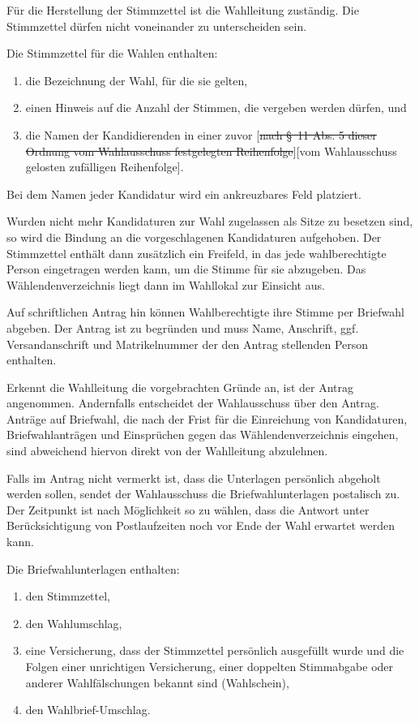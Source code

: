\documentclass[%
draft,%
multilinesections%
]{fswo}
\newcommand\oldT[1]  {{\color{Gray}[\st{#1}]}}
\newcommand\newT[1]  {{\color{Green}[#1]}}
\newcommand\oldT[1]{}%
\newcommand\newT[1]{#1}
\newcommand\change[2]{\oldT{#1}\newT{#2}}
\begin{document}
\begin{contract}
Für die Herstellung der Stimmzettel ist die Wahlleitung zuständig.
Die Stimmzettel dürfen nicht voneinander zu unterscheiden sein.

Die Stimmzettel für die Wahlen enthalten:
\begin{enumerate}
\item die Bezeichnung der Wahl, für die sie gelten,
\item einen Hinweis auf die Anzahl der Stimmen, die vergeben werden dürfen, und
\item die Namen der Kandidierenden in einer zuvor \change{nach \S~11 Abs. 5 dieser Ordnung vom Wahlausschuss festgelegten Reihenfolge}{vom Wahlausschuss gelosten zufälligen Reihenfolge}.
\end{enumerate}
Bei dem Namen jeder Kandidatur wird ein ankreuzbares Feld platziert.

Wurden nicht mehr Kandidaturen zur Wahl zugelassen als Sitze zu besetzen sind, so wird die Bindung an die vorgeschlagenen Kandidaturen aufgehoben.
Der Stimmzettel enthält dann zusätzlich ein Freifeld, in das jede wahlberechtigte Person eingetragen werden kann, um die Stimme für sie abzugeben.
Das Wählendenverzeichnis liegt dann im Wahllokal zur Einsicht aus.

Auf schriftlichen Antrag hin können Wahlberechtigte ihre Stimme per Briefwahl abgeben.
Der Antrag ist zu begründen und muss Name, Anschrift, ggf. Versandanschrift und Matrikelnummer der den Antrag stellenden Person enthalten.

Erkennt die Wahlleitung die vorgebrachten Gründe an, ist der Antrag angenommen.
Andernfalls entscheidet der Wahlausschuss über den Antrag.
Anträge auf Briefwahl, die nach der Frist für die Einreichung von Kandidaturen, Briefwahlanträgen und Einsprüchen gegen das Wählendenverzeichnis eingehen, sind abweichend hiervon direkt von der Wahlleitung abzulehnen.

Falls im Antrag nicht vermerkt ist, dass die Unterlagen persönlich abgeholt werden sollen, sendet der Wahlausschuss die Briefwahlunterlagen postalisch zu.
Der Zeitpunkt ist nach Möglichkeit so zu wählen, dass die Antwort unter Berücksichtigung von Postlaufzeiten noch vor Ende der Wahl erwartet werden kann.

Die Briefwahlunterlagen enthalten:
\begin{enumerate}
\item den Stimmzettel,
\item den Wahlumschlag,
\item eine Versicherung, dass der Stimmzettel persönlich ausgefüllt wurde und die Folgen einer unrichtigen Versicherung, einer doppelten Stimmabgabe oder anderer Wahlfälschungen bekannt sind (Wahlschein),
\item den Wahlbrief-Umschlag.
\end{enumerate}


\end{contract}
\end{document}
